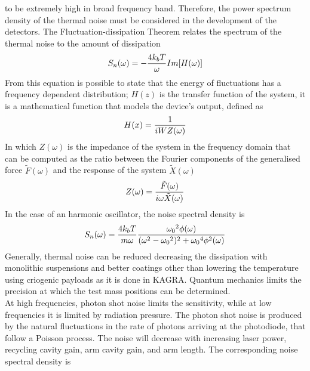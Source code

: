\documentclass[binding=0.6cm, LaM]{sapthesis}
\begin{document}
        to be extremely high in broad frequency band.
        Therefore, the power spectrum density of the thermal noise must be considered in the development of the detectors.
        The Fluctuation-dissipation Theorem relates the spectrum of the thermal noise to the amount of dissipation
                \begin{equation}
                	S_{n}(\omega) = - {{4k_bT} \over {\omega}} Im[H(\omega)]
                \end{equation}
        From this equation is possible to state that the energy of fluctuations has a frequency dependent distribution;
        $H(z)$ is the transfer function of the system, it is a mathematical function that models the device’s output, defined as
                \begin{equation}
                	H(x) = {1 \over {iWZ(\omega)}}
                \end{equation}
        In which $Z(\omega)$ is the impedance of the system in the frequency domain that can be computed as the ratio
        between the Fourier components of the generalised force $\tilde F(\omega)$ and the response of the system $\tilde X(\omega)$
                \begin{equation}
                	Z(\omega) = {{\tilde F(\omega)} \over {i\omega \tilde X(\omega)}}
                \end{equation}
        In the case of an harmonic oscillator, the noise spectral density is
                \begin{equation}
                	S_n(\omega) = {{4k_bT} \over {m\omega}} {{{\omega_0}^2 \phi(\omega)} \over {(\omega^2-{\omega_0}^2)^2 + {\omega_0}^4 \phi^2(\omega)}}
		\end{equation} 
	Generally, thermal noise can be reduced decreasing the dissipation with monolithic suspensions and better coatings
        other than lowering the temperature using criogenic payloads as it is done in KAGRA.
        Quantum mechanics limits the precision at which the test mass positions can be determined. \\
        At high frequencies, photon shot noise limits the sensitivity, 
	while at low frequencies it is limited by radiation pressure.
        The photon shot noise is produced by the natural fluctuations in the rate of photons arriving at the photodiode,
        that follow a Poisson process. The noise will decrease with increasing laser power,
        recycling cavity gain, arm cavity gain, and arm length.
        The corresponding noise spectral density is
\end{document}
